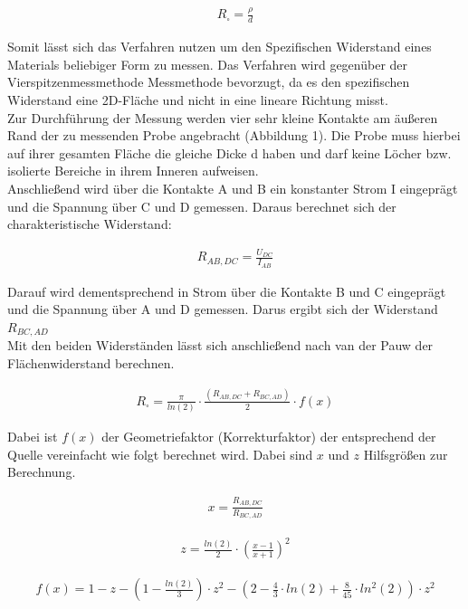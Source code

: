 \documentclass[a4paper]{scrartcl}
\numberwithin{equation}{subsection}
\begin{document}
\begin{align}
R_{\square} = \frac{\rho}{d}
\end{align}

Somit lässt sich das Verfahren nutzen um den Spezifischen Widerstand eines Materials beliebiger Form zu messen. \cite{anl}
Das Verfahren wird gegenüber der Vierspitzenmessmethode Messmethode bevorzugt, da es den spezifischen Widerstand eine 2D-Fläche und nicht in eine lineare Richtung misst. \cite{phyglob} \\

Zur Durchführung der Messung werden vier sehr kleine Kontakte am äußeren Rand der zu messenden Probe angebracht (Abbildung 1). Die Probe muss hierbei auf ihrer gesamten Fläche die gleiche Dicke d haben und darf keine Löcher bzw. isolierte Bereiche in ihrem Inneren aufweisen. \cite{anl} \\

Anschließend wird über die Kontakte A und B ein konstanter Strom I eingeprägt und die Spannung über C und D gemessen. Daraus berechnet sich der charakteristische Widerstand: \cite{phyglob}

\begin{align}
R_{AB,DC} = \frac{U_{DC}}{I_{AB}}
\end{align}

Darauf wird dementsprechend in Strom über die Kontakte B und C eingeprägt und die Spannung über A und D gemessen. Darus ergibt sich der Widerstand $R_{BC,AD}$ \cite{anl} \\

Mit den beiden Widerständen lässt sich anschließend nach van der Pauw der Flächenwiderstand berechnen. \cite{anl}

\begin{align}
R_{\square} = \frac{\pi}{ln(2)} \cdot \frac{(R_{AB,DC}+R_{BC,AD})}{2} \cdot f(x)
\end{align}

Dabei ist $f(x)$ der Geometriefaktor (Korrekturfaktor) der entsprechend der Quelle \cite{anl} vereinfacht wie folgt berechnet wird. Dabei sind $x$ und $z$ Hilfsgrößen zur Berechnung.

\begin{align}
x = \frac{R_{AB,DC}}{R_{BC,AD}}
\end{align}

\begin{align}
z = \frac{ln(2)}{2} \cdot \left(\frac{x-1}{x+1}\right)^2
\end{align}

\begin{align}
f(x) = 1 - z - \left( 1-\frac{ln(2)}{3}\right)  \cdot z^2 - \left( 2 - \frac{4}{3} \cdot ln(2) + \frac{8}{45} \cdot ln^2(2)\right) \cdot z^2
\end{align}
\end{document}
